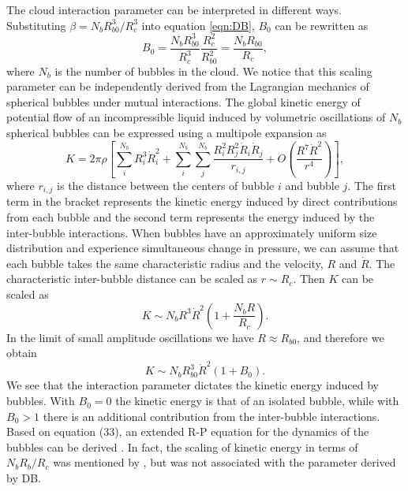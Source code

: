 \documentclass{jfm}
\begin{document}
The cloud interaction parameter can be interpreted in different ways.
Substituting $\beta=N_bR^3_{b0}/R^3_c$ into equation \ref{eqn:DB}, $B_0$ can be rewritten as
\begin{equation}
B_0=\frac{N_bR^3_{b0}}{R^3_c}\frac{R^2_c}{R^2_{b0}}=\frac{N_bR_{b0}}{R_c},
\end{equation}
where $N_b$ is the number of bubbles in the cloud.
We notice that this scaling parameter can be independently derived from the Lagrangian mechanics of spherical bubbles under mutual interactions.
The global kinetic energy of potential flow of an incompressible liquid induced by volumetric oscillations of $N_b$ spherical bubbles can be expressed using a multipole expansion \citep{Takahira94,Ilinskii07} as
\begin{equation}
K = 2\pi\rho\left[\sum^{N_{b}}_iR_i^3\dot{R}_i^2+\sum^{N_{b}}_i\sum^{N_{b}}_j\frac{R_i^2R_j^2\dot{R}_i\dot{R}_j}{r_{i,j}}+O\left(\frac{R^7\dot{R}^2}{r^4}\right)\right],
\label{eqn:mRP}
\end{equation}
where $r_{i,j}$ is the distance between the centers of bubble $i$ and bubble $j$.
The first term in the bracket represents the kinetic energy induced by direct contributions from each bubble and the second term represents the energy induced by the inter-bubble interactions.
When bubbles have an approximately uniform size distribution and experience simultaneous change in pressure, we can assume that each bubble takes the same characteristic radius and the velocity, $R$ and $\dot{R}$.
The characteristic inter-bubble distance can be scaled as $r\sim R_c$.
Then $K$ can be scaled as
\begin{equation}
K \sim N_b R^3\dot{R}^2\left(1+\frac{N_{b}R}{R_c}\right).
\end{equation}
In the limit of small amplitude oscillations we have $R\approx R_{b0}$, and therefore we obtain
\begin{equation}
K \sim N_b R_{b0}^3\dot{R}^2\left(1+B_0\right).
\end{equation}
We see that the interaction parameter dictates the kinetic energy induced by bubbles.
With $B_0=0$ the kinetic energy is that of an isolated bubble, while with $B_0>1$ there is an additional contribution from the inter-bubble interactions.
Based on equation (33), an extended R-P equation for the dynamics of the bubbles can be derived \citep{Takahira94,Doinikov04,Bremond06,Ilinskii07,Zeravcic11}.
In fact, the scaling of kinetic energy in terms of $N_bR_b/R_c$ was mentioned by \citet{Ilinskii07}, but was not associated with the parameter derived by DB.
\end{document}
